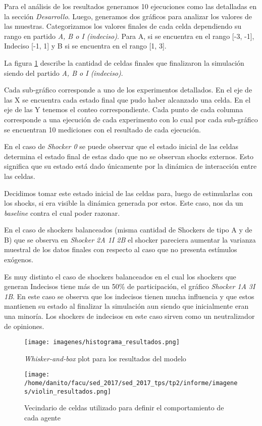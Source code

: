 Para el análisis de los resultados generamos 10 ejecuciones como las detalladas
en la sección \textit{Desarrollo}.
Luego, generamos dos gráficos para analizar los valores de las muestras.
Categorizamos los valores finales de cada celda dependiendo su rango en partido
\textit{A, B o I (indeciso)}. Para A, si se encuentra en el rango [-3, -1], Indeciso [-1, 1]  y B si se encuentra en el rango [1, 3].

La figura \ref{fig:modelo_shock_box} describe la cantidad de celdas finales que
finalizaron la simulación siendo del partido \textit{A, B o I (indeciso)}.

Cada sub-gráfico corresponde a uno de los experimentos detallados. En el eje de
las X se encuentra cada estado final que pudo haber alcanzado una celda. En el
eje de las Y tenemos el conteo correspondiente.  Cada punto de cada columna
corresponde a una ejecución de cada experimento con lo cual por cada
sub-gráfico se encuentran 10 mediciones con el resultado de cada ejecución.


En el caso de \textit{Shocker 0} se puede observar que el estado inicial de las
celdas determina el estado final de estas dado que no se observan shocks
externos. Esto significa que su estado está dado únicamente por la dinámica de
interacción entre las celdas.

Decidimos tomar este estado inicial de las celdas para, luego de estimularlas
con los shocks, si era visible la dinámica generada por estos.
Este caso, nos da un \textit{baseline} contra el cual poder razonar.

En el caso de shockers balanceados (misma cantidad de Shockers de tipo A  y de
B) que se observa en \textit{Shocker 2A 1I 2B} el shocker
pareciera aumentar la varianza muestral de los datos finales con respecto al
caso que no presenta estímulos exógenos.

Es muy distinto el caso de shockers balanceados en el cual los shockers que generan
Indecisos tiene más de un 50\% de participación, el gráfico \textit{Shocker 1A 3I 1B}.
En este caso se observa que los indecisos tienen mucha influencia y que estos
mantienen su estado al finalizar la simulación aun siendo que inicialmente eran una minoría.
Los shockers de indecisos en este caso sirven como un neutralizador de opiniones.



\begin{figure}[!h]
\centering
\texttt{[image: imagenes/histograma\_resultados.png]}
    \caption{\textit{Whisker-and-box} plot para los resultados del modelo}
\label{fig:modelo_shock_box}
\end{figure}

\begin{figure}[!h]
\centering
\texttt{[image: /home/danito/facu/sed\_2017/sed\_2017\_tps/tp2/informe/imagenes/violin\_resultados.png]}
\caption{Vecindario de celdas utilizado para definir el comportamiento de cada agente}
\label{fig:modelo_shock_violin}
\end{figure}


